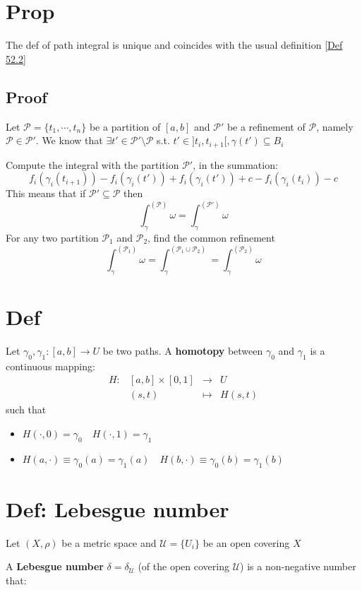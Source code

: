 \documentclass{book}
\newcommand{\leftbracket}{[}
\newcommand{\rightbracket}{]}
\begin{document}
\section{Prop}
The def of path integral is unique and coincides with the usual definition \ref{Def 52.2}
\subsection*{Proof}
Let $\mathcal{P}=\{t_1,\cdots,t_n\}$ be a partition of $[a,b]$ and $\mathcal{P}'$ be a refinement of $\mathcal{P}$, namely $\mathcal{P}\in \mathcal{P}'$. We know that $\exists t'\in \mathcal{P}'\setminus\mathcal{P}$ s.t. $t'\in\rightbracket t_i,t_{i+1}\leftbracket,\gamma(t')\subseteq B_i$

Compute the integral with the partition $\mathcal{P}'$, in the summation:
$$f_i(\gamma_i(t_{i+1}))-f_i(\gamma_i(t'))+f_i(\gamma_i(t'))+c-f_i(\gamma_i(t_i))-c$$
This means that if $\mathcal{P}'\subseteq\mathcal{P}$ then $$\int_\gamma^{(\mathcal{P})}\omega=\int_\gamma^{(\mathcal{P}')}\omega$$
For any two partition $\mathcal{P}_1$ and $\mathcal{P}_2$, find the common refinement $$\int_\gamma^{(\mathcal{P}_1)}\omega=\int_\gamma^{(\mathcal{P}_1\cup\mathcal{P}_2)}=\int_\gamma^{(\mathcal{P}_2)}\omega$$
\section{Def}
Let $\gamma_0,\gamma_1:[a,b]\rightarrow U$ be two paths. A \textbf{homotopy} between $\gamma_0$ and $\gamma_1$ is a continuous mapping:
$$\begin{aligned}
    H:&[a,b]\times[0,1]&\rightarrow&U\\
    &(s,t)&\mapsto&H(s,t)
\end{aligned}$$
such that\begin{itemize}
    \item $H(\cdot,0)=\gamma_0\quad H(\cdot,1)=\gamma_1$
    \item $H(a,\cdot)\equiv \gamma_0(a)=\gamma_1(a)\quad H(b,\cdot)\equiv\gamma_0(b)=\gamma_1(b)$
\end{itemize}

\section{Def: Lebesgue number}
Let $(X,\rho)$ be a metric space and $\mathcal{U}=\{U_i\}$ be an open covering $X$

A \textbf{Lebesgue number} $\delta=\delta_{\mathcal{U}}$ (of the open covering $\mathcal{U}$) is a non-negative number that:
\end{document}
